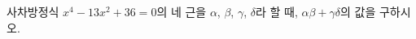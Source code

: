 사차방정식 $x^4-13x^2+36=0$의 네 근을 $\alpha$, $\beta$, $\gamma$, $\delta$라 할 때, $\alpha\beta+\gamma\delta$의 값을 구하시오. \dmcondfill{$\alpha<\beta<\gamma<\delta$}{}
